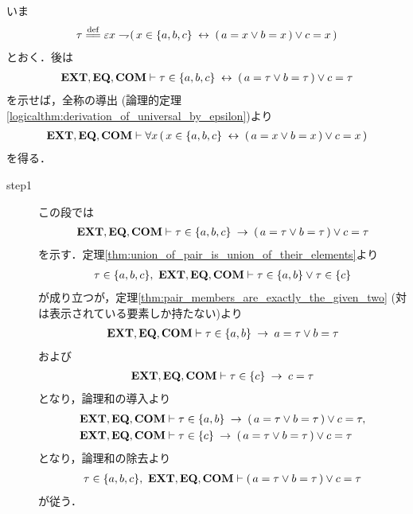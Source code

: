 	\begin{sketch}
		いま
		\begin{align}
			\tau \defeq \varepsilon x \negation (\, x \in \{a,b,c\} \lrarrow 
			(\, a = x \vee b = x\, ) \vee c = x\, )
		\end{align}
		とおく．後は
		\begin{align}
			\mbox{{\bf EXT}},\mbox{{\bf EQ}},\mbox{\bf COM} \vdash \tau \in \{a,b,c\} \hspace{0.25em}\leftrightarrow\hspace{0.25em} 
			(\, a = \tau \vee b = \tau\, ) \vee c = \tau
		\end{align}
		を示せば，全称の導出
		(論理的定理\ref{logicalthm:derivation_of_universal_by_epsilon})より
		\begin{align}
			\mbox{{\bf EXT}},\mbox{{\bf EQ}},\mbox{\bf COM} \vdash 
			\forall x\, (\, x \in \{a,b,c\} \hspace{0.25em}\leftrightarrow\hspace{0.25em} 
			(\, a = x \vee b = x\, ) \vee c = x\, )
		\end{align}
		を得る．
		\begin{description}
			\item[step1]
				この段では
				\begin{align}
					\mbox{{\bf EXT}},\mbox{{\bf EQ}},\mbox{\bf COM} \vdash \tau \in \{a,b,c\} \hspace{0.25em}\rightarrow\hspace{0.25em} 
					(\, a = \tau \vee b = \tau\, ) \vee c = \tau
				\end{align}
				を示す．定理\ref{thm:union_of_pair_is_union_of_their_elements}より
				\begin{align}
					\tau \in \{a,b,c\},\ \mbox{{\bf EXT}},\mbox{{\bf EQ}},\mbox{\bf COM} \vdash 
					\tau \in \{a,b\} \vee \tau \in \{c\}
				\end{align}
				が成り立つが，定理\ref{thm:pair_members_are_exactly_the_given_two}
				(対は表示されている要素しか持たない)より
				\begin{align}
					\mbox{{\bf EXT}},\mbox{{\bf EQ}},\mbox{\bf COM} \vdash \tau \in \{a,b\} \hspace{0.25em}\rightarrow\hspace{0.25em} 
					a = \tau \vee b = \tau
				\end{align}
				および
				\begin{align}
					\mbox{{\bf EXT}},\mbox{{\bf EQ}},\mbox{\bf COM} \vdash \tau \in \{c\} \hspace{0.25em}\rightarrow\hspace{0.25em} c = \tau
				\end{align}
				となり，論理和の導入より
				\begin{align}
					\mbox{{\bf EXT}},\mbox{{\bf EQ}},\mbox{\bf COM} &\vdash \tau \in \{a,b\} \hspace{0.25em}\rightarrow\hspace{0.25em} 
					(\, a = \tau \vee b = \tau\, ) \vee c = \tau, \\
					\mbox{{\bf EXT}},\mbox{{\bf EQ}},\mbox{\bf COM} &\vdash \tau \in \{c\} \hspace{0.25em}\rightarrow\hspace{0.25em} 
					(\, a = \tau \vee b = \tau\, ) \vee c = \tau
				\end{align}
				となり，論理和の除去より
				\begin{align}
					\tau \in \{a,b,c\},\ \mbox{{\bf EXT}},\mbox{{\bf EQ}},\mbox{\bf COM} \vdash 
					(\, a = \tau \vee b = \tau\, ) \vee c = \tau
				\end{align}
				が従う．
				

\end{description}
\end{sketch}

